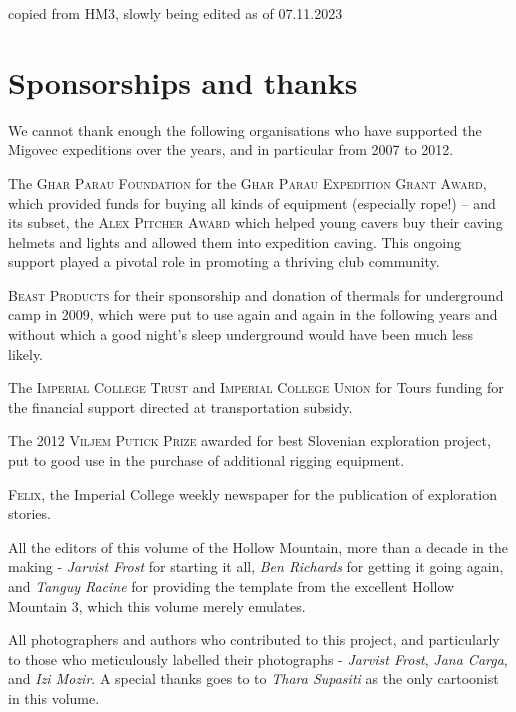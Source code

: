 copied from HM3, slowly being edited as of 07.11.2023


\chapter{Sponsorships and thanks}
We cannot thank enough the following organisations who have supported the Migovec expeditions over the years, and in particular from 2007 to 2012.
\begin{citemize}
\item The \textsc{Ghar Parau Foundation} for the \textsc{Ghar Parau Expedition Grant Award}, which provided funds for buying all kinds of equipment (especially rope!) -- and its subset, the \textsc{Alex Pitcher Award} which helped young cavers buy their caving helmets and lights and allowed them into expedition caving. This ongoing support played a pivotal role in promoting a thriving club community.
\item \textsc{Beast Products} for their sponsorship and donation of thermals for underground camp in 2009, which were put to use again and again in the following years and without which a good night's sleep underground would have been much less likely.
\item The \textsc{Imperial College Trust} and  \textsc{Imperial College Union} for Tours funding for the financial support directed at transportation subsidy.

\item The \textsc{2012 Viljem Putick Prize} awarded for best Slovenian exploration project, put to good use in the purchase of additional rigging equipment.

\item \textsc{Felix}, the Imperial College weekly newspaper for the publication of exploration stories.


\mydelimiter

\item All the editors of this volume of the Hollow Mountain, more than a decade in the making - \textit{Jarvist Frost} for starting it all, \textit{Ben Richards} for getting it going again, and \textit{Tanguy Racine} for providing the template from the excellent Hollow Mountain 3, which this volume merely emulates. 

\item All photographers and authors who contributed to this project, and particularly to those who meticulously labelled their photographs - \textit{Jarvist Frost}, \textit{Jana Carga}, and \textit{Izi Mozir}. A special thanks goes to to \textit{Thara Supasiti} as the only cartoonist in this volume.


\end{citemize}
